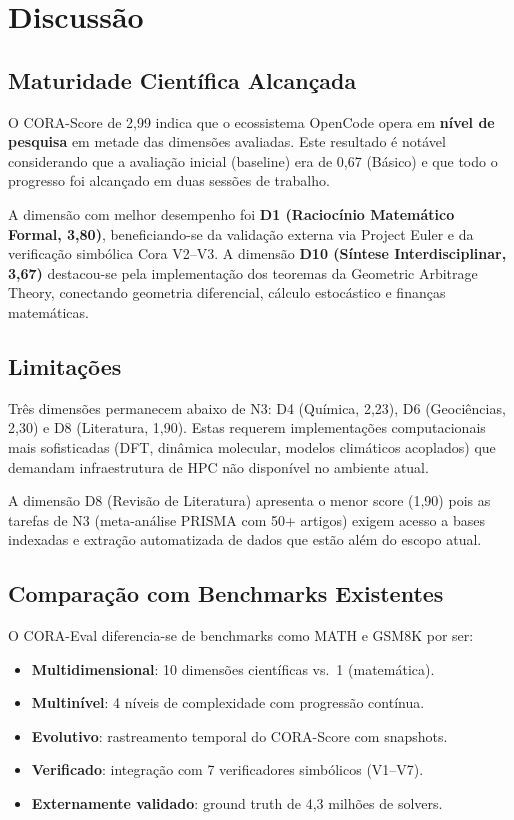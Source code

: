 \documentclass[12pt,a4paper]{article}
\begin{document}
\section{Discussão}

\subsection{Maturidade Científica Alcançada}

O CORA-Score de 2,99 indica que o ecossistema OpenCode opera em \textbf{nível de
pesquisa} em metade das dimensões avaliadas. Este resultado é notável
considerando que a avaliação inicial (baseline) era de 0,67 (Básico) e que todo
o progresso foi alcançado em duas sessões de trabalho.

A dimensão com melhor desempenho foi \textbf{D1 (Raciocínio Matemático Formal,
3,80)}, beneficiando-se da validação externa via Project Euler e da verificação
simbólica Cora V2--V3. A dimensão \textbf{D10 (Síntese Interdisciplinar, 3,67)}
destacou-se pela implementação dos teoremas da Geometric Arbitrage Theory,
conectando geometria diferencial, cálculo estocástico e finanças matemáticas.

\subsection{Limitações}

Três dimensões permanecem abaixo de N3: D4 (Química, 2,23), D6 (Geociências,
2,30) e D8 (Literatura, 1,90). Estas requerem implementações computacionais
mais sofisticadas (DFT, dinâmica molecular, modelos climáticos acoplados) que
demandam infraestrutura de HPC não disponível no ambiente atual.

A dimensão D8 (Revisão de Literatura) apresenta o menor score (1,90) pois as
tarefas de N3 (meta-análise PRISMA com 50+ artigos) exigem acesso a bases
indexadas e extração automatizada de dados que estão além do escopo atual.

\subsection{Comparação com Benchmarks Existentes}

O CORA-Eval diferencia-se de benchmarks como MATH \cite{hendrycks2021math}
e GSM8K \cite{cobbe2021gsm8k} por ser:
\begin{itemize}
\item \textbf{Multidimensional}: 10 dimensões científicas vs.\ 1 (matemática).
\item \textbf{Multinível}: 4 níveis de complexidade com progressão contínua.
\item \textbf{Evolutivo}: rastreamento temporal do CORA-Score com snapshots.
\item \textbf{Verificado}: integração com 7 verificadores simbólicos (V1--V7).
\item \textbf{Externamente validado}: ground truth de 4,3 milhões de solvers.
\end{itemize}
\end{document}
